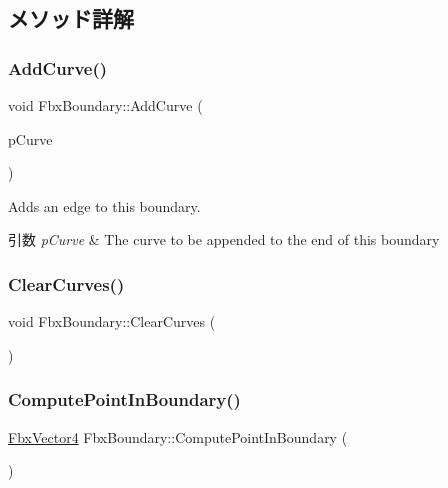 \subsection{メソッド詳解}
\mbox{\label{class_fbx_boundary_af94f173acd55d7d5f285f8539bbb48e4}} 
\subsubsection{\texorpdfstring{Add\+Curve()}{AddCurve()}}
{\footnotesize\ttfamily void Fbx\+Boundary\+::\+Add\+Curve (\begin{DoxyParamCaption}\item[{\hyperlink{class_fbx_nurbs_curve}{Fbx\+Nurbs\+Curve} $\ast$}]{p\+Curve }\end{DoxyParamCaption})}

Adds an edge to this boundary. 
\begin{DoxyParams}{引数}
{\em p\+Curve} & The curve to be appended to the end of this boundary \\
\hline
\end{DoxyParams}
\mbox{\label{class_fbx_boundary_aa1c12f34cb325c5a337fa383f0860e06}} 
\subsubsection{\texorpdfstring{Clear\+Curves()}{ClearCurves()}}
{\footnotesize\ttfamily void Fbx\+Boundary\+::\+Clear\+Curves (\begin{DoxyParamCaption}{ }\end{DoxyParamCaption})}

\mbox{\label{class_fbx_boundary_a615c36267401342800e00befefa50f6c}} 
\subsubsection{\texorpdfstring{Compute\+Point\+In\+Boundary()}{ComputePointInBoundary()}}
{\footnotesize\ttfamily \hyperlink{class_fbx_vector4}{Fbx\+Vector4} Fbx\+Boundary\+::\+Compute\+Point\+In\+Boundary (\begin{DoxyParamCaption}{ }\end{DoxyParamCaption})}

